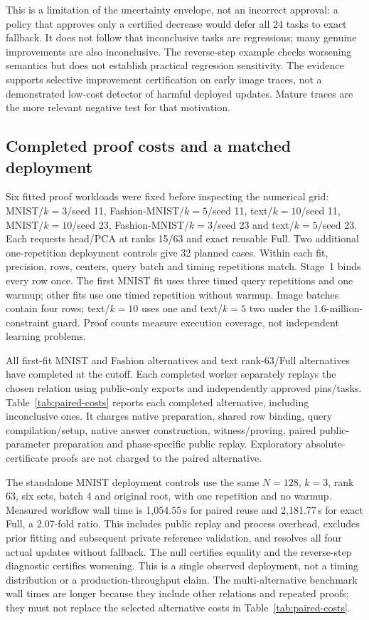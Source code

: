 This is a limitation of the uncertainty envelope, not an incorrect approval:
a policy that approves only a certified decrease would defer all 24 tasks to
exact fallback. It does not follow that inconclusive tasks are regressions;
many genuine improvements are also inconclusive. The reverse-step example
checks worsening semantics but does not establish practical regression
sensitivity. The evidence supports selective improvement certification on
early image traces, not a demonstrated low-cost detector of harmful deployed
updates. Mature traces are the more relevant negative test for that motivation.

\subsection{Completed proof costs and a matched deployment}\label{sec:paired-proof-results}
Six fitted proof workloads were fixed before inspecting the numerical grid:
MNIST/$k=3$/seed 11, Fashion-MNIST/$k=5$/seed 11, text/$k=10$/seed 11,
MNIST/$k=10$/seed 23, Fashion-MNIST/$k=3$/seed 23 and text/$k=5$/seed 23.
Each requests head/PCA at ranks 15/63 and exact reusable Full. Two additional
one-repetition deployment controls give 32 planned cases. Within each fit,
precision, rows, centers, query batch and timing repetitions match. Stage~1
binds every row once. The first MNIST fit uses three timed query repetitions
and one warmup; other fits use one timed repetition without warmup. Image
batches contain four rows; text/$k=10$ uses one and text/$k=5$ two under the
1.6-million-constraint guard. Proof counts measure execution coverage, not
independent learning problems.

All first-fit MNIST and Fashion alternatives and text rank-63/Full alternatives
have completed at the cutoff. Each completed worker separately replays the
chosen relation using public-only exports and independently approved pins/tasks.
Table~\ref{tab:paired-costs} reports each completed alternative, including
inconclusive ones. It charges native preparation, shared row binding, query
compilation/setup, native answer construction, witness/proving, paired
public-parameter preparation and phase-specific public replay. Exploratory
absolute-certificate proofs are not charged to the paired alternative.


The standalone MNIST deployment controls use the same $N=128$, $k=3$, rank 63,
six sets, batch 4 and original root, with one repetition and no warmup.
Measured workflow wall time is 1,054.55\,s for paired reuse and 2,181.77\,s
for exact Full, a 2.07-fold ratio. This includes public replay and process
overhead, excludes prior fitting and subsequent private reference validation,
and resolves all four actual updates without fallback. The null certifies
equality and the reverse-step diagnostic certifies worsening. This is a single
observed deployment, not a timing distribution or a production-throughput claim.
The multi-alternative benchmark wall times are longer because they include
other relations and repeated proofs; they must not replace the selected
alternative costs in Table~\ref{tab:paired-costs}.

